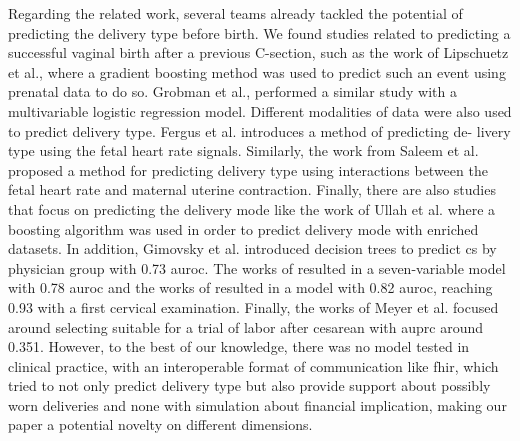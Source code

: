 Regarding the related work, several teams already tackled the potential of predicting the delivery type before birth. We found studies related to predicting a successful vaginal birth after a previous C-section, such as the work of Lipschuetz et al., \cite{lipschuetzPredictionVaginalBirth2020}  where a gradient boosting method was used to predict such an event using prenatal data to do so. Grobman et al., \cite{grobman_development_2007} performed a similar study with a multivariable logistic regression model. Different modalities of data were also used to predict delivery type. Fergus et al. \cite{fergusClassificationCaesareanSection2017} introduces a method of predicting de- livery type using the fetal heart rate signals. Similarly, the work from Saleem et al. \cite{saleemStrategyClassificationVaginal2019a} proposed a method for predicting delivery type using interactions between the fetal heart rate and maternal uterine contraction. Finally, there are also studies that focus on predicting the delivery mode like the work of Ullah et al. \cite{ullah_reliable_2021} where a boosting algorithm was used in order to predict delivery mode with enriched datasets. In addition, Gimovsky et al. \cite{gimovskyBenchmarkingCesareanDelivery} introduced decision trees to predict \ac{cs} by physician group with 0.73 \ac{auroc}. The works of \cite{rossiRiskCalculatorPredict2020b} resulted in a seven-variable model with 0.78 \ac{auroc} and the works of \cite{guedaliaRealtimeDataAnalysis2020} resulted in a model with 0.82 \ac{auroc}, reaching 0.93 with a first cervical examination. Finally, the works of Meyer et al. \cite{meyerImplementationMachineLearning2020} focused around selecting suitable for a trial of labor after cesarean with \ac{auprc} around 0.351. However, to the best of our knowledge, there was no model tested in clinical practice, with an interoperable format of communication like \ac{fhir}, which tried to not only predict delivery type but also provide support about possibly worn deliveries and none with simulation about financial implication, making our paper a potential novelty on different dimensions.